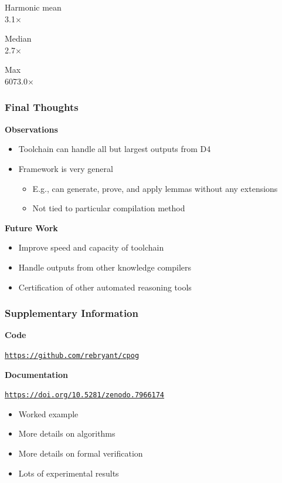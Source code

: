\documentclass[t,pdf]{beamer}
\newcommand{\cref}[2]{\href{#1}{\color{blue}#2}}
\newcommand{\hcref}[1]{\cref{#1}{\small\tt #1}}
\newcommand{\bitem}{\item[$\bullet$]}
\begin{document}
\begin{frame}
\begin{minipage}{0.25\textwidth}
\medskip

Harmonic mean\\
\-\hspace{2ex} 3.1$\times$

\medskip

Median\\
\-\hspace{2ex} 2.7$\times$

\medskip

Max\\
\-\hspace{2ex} 6073.0$\times$
\end{minipage}
\end{frame}


\begin{frame}
  \frametitle{Final Thoughts}

  \medskip

  {\bf Observations}
  \begin{itemize}
  \item Toolchain can handle all but largest outputs from D4
  \item Framework is very general
    \begin{itemize}
      \bitem E.g., can generate, prove, and apply lemmas without any extensions
      \bitem Not tied to particular compilation method
    \end{itemize}
  \end{itemize}

  \medskip

  {\bf Future Work}
  \begin{itemize}
  \item Improve speed and capacity of toolchain
  \item Handle outputs from other knowledge compilers
  \item Certification of other automated reasoning tools
  \end{itemize}

\end{frame}

\begin{frame}
\frametitle{Supplementary Information}

\medskip
{\bf Code}
\begin{center}
 \hcref{https://github.com/rebryant/cpog}
\end{center}
{\bf Documentation}
\begin{center}
 \hcref{https://doi.org/10.5281/zenodo.7966174}
\end{center}
\begin{itemize}
\item Worked example
\item More details on algorithms
\item More details on formal verification
\item Lots of experimental results
\end{itemize}

\end{frame}
\end{document}
